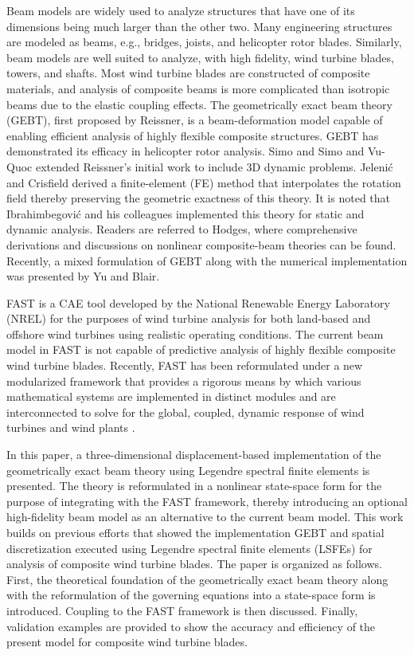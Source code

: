 \documentclass{aiaa-tc}
\begin{document}
Beam models are widely used to analyze structures that have one of its
dimensions being much larger than the other two.  Many engineering
structures are modeled as beams, e.g.,  bridges, joists, and helicopter
rotor blades.  Similarly, beam models are well suited to analyze, with high
fidelity,  wind turbine blades, towers, and shafts.  Most wind turbine
blades are constructed of composite materials, and analysis of composite
beams is more complicated than isotropic beams due to the elastic coupling
effects.  The geometrically exact beam theory (GEBT), first proposed by
Reissner\cite{Ressiner1973}, is a beam-deformation model capable of
enabling efficient analysis of highly flexible composite structures.
GEBT has demonstrated its efficacy in helicopter rotor analysis.
Simo\cite{Simo1985} and Simo and Vu-Quoc\cite{Simo1986} extended Reissner's
initial work to include 3D dynamic problems. Jeleni\'c and
Crisfield\cite{Crisfield1999} derived a finite-element (FE) method that
interpolates the rotation field thereby preserving the geometric exactness
of this theory. It is noted that Ibrahimbegovi\'c and his colleagues
implemented this theory for static\cite{Ibrahim1995} and
dynamic\cite{Ibrahim1998} analysis. Readers are referred to
Hodges\cite{HodgesBeamBook}, where comprehensive derivations and discussions
on nonlinear composite-beam theories can be found. Recently, a mixed
formulation of GEBT along with the numerical implementation was presented by
Yu and Blair\cite{YuGEBT}.  

FAST is a CAE tool developed by the National Renewable Energy Laboratory
(NREL) for the purposes of wind turbine analysis for both land-based and
offshore wind turbines using realistic operating conditions.  The current
beam model in FAST is not capable of predictive analysis of highly flexible
composite wind turbine blades.
Recently, FAST has been reformulated under a
new modularized framework that provides a rigorous means by which various
mathematical systems are implemented in distinct modules and are interconnected
to solve for the global, coupled, dynamic response of wind turbines and wind
plants \cite{Jonkman:2013,website:FASTModularizationFramework}.

In this paper, a three-dimensional displacement-based
implementation of the geometrically exact beam theory using Legendre
spectral finite elements is presented. The theory is reformulated in a
nonlinear state-space form for the purpose of integrating with the FAST
framework, thereby introducing an optional high-fidelity beam model as an
alternative to the current beam model. This work builds on previous efforts
that showed the implementation GEBT and spatial discretization executed
using Legendre spectral finite elements
(LSFEs)\cite{Wang:GEBT2013,Wang:SFE2013,Wang:GEBT2014,Sprague:FAST2014} for
analysis of composite wind turbine blades. The paper is organized as
follows.  First, the theoretical foundation of the geometrically exact beam
theory along with the reformulation of the governing equations into a
state-space form is introduced. Coupling to the FAST framework is then
discussed. Finally, validation examples are
provided to show the accuracy and efficiency of the present model for
composite wind turbine blades. 
\end{document}

